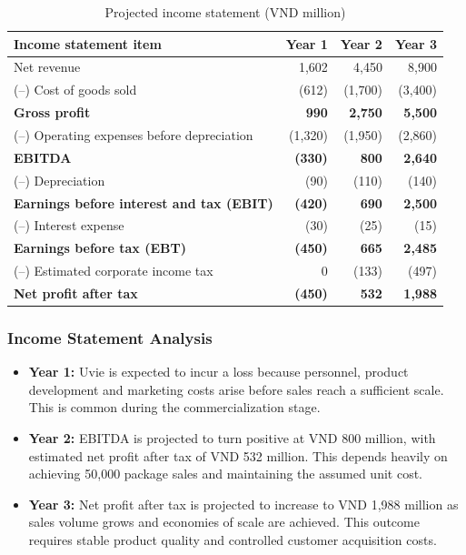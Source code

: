 \begin{table}[ht]
\centering\small
\caption{Projected income statement (VND million)}\label{tab:income}
\begin{tabular}{@{}L{8.0cm}rrr@{}}
  \toprule
  \textbf{Income statement item} & \textbf{Year 1} & \textbf{Year 2} & \textbf{Year 3}\\
  \midrule
  Net revenue & 1,602 & 4,450 & 8,900\\
  (--) Cost of goods sold & (612) & (1,700) & (3,400)\\
  \textbf{Gross profit} & \textbf{990} & \textbf{2,750} & \textbf{5,500}\\
  (--) Operating expenses before depreciation & (1,320) & (1,950) & (2,860)\\
  \textbf{EBITDA} & \textbf{(330)} & \textbf{800} & \textbf{2,640}\\
  (--) Depreciation & (90) & (110) & (140)\\
  \textbf{Earnings before interest and tax (EBIT)} & \textbf{(420)} & \textbf{690} & \textbf{2,500}\\
  (--) Interest expense & (30) & (25) & (15)\\
  \textbf{Earnings before tax (EBT)} & \textbf{(450)} & \textbf{665} & \textbf{2,485}\\
  (--) Estimated corporate income tax & 0 & (133) & (497)\\
  \midrule
  \textbf{Net profit after tax} & \textbf{(450)} & \textbf{532} & \textbf{1,988}\\
  \bottomrule
\end{tabular}
\end{table}

\subsubsection{Income Statement Analysis}
\begin{itemize}[itemsep=0pt]
  \item \textbf{Year 1:} Uvie is expected to incur a loss because personnel,
    product development and marketing costs arise before sales reach a
    sufficient scale. This is common during the commercialization stage.
  \item \textbf{Year 2:} EBITDA is projected to turn positive at VND 800 million,
    with estimated net profit after tax of VND 532 million. This depends heavily
    on achieving 50,000 package sales and maintaining the assumed unit cost.
  \item \textbf{Year 3:} Net profit after tax is projected to increase to
    VND 1,988 million as sales volume grows and economies of scale are achieved.
    This outcome requires stable product quality and controlled customer
    acquisition costs.
\end{itemize}

